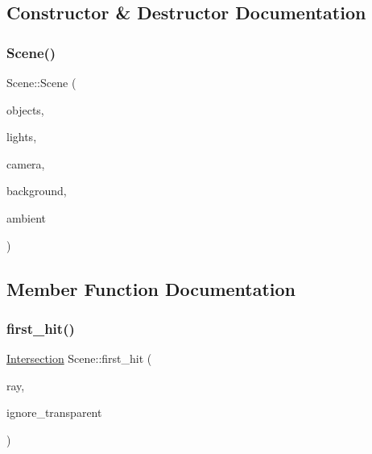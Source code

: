 \subsection{Constructor \& Destructor Documentation}
\mbox{\label{classScene_aa05f285f7a7df49c03ce32fb1c43c9ae}} 
\subsubsection{\texorpdfstring{Scene()}{Scene()}}
{\footnotesize\ttfamily Scene\+::\+Scene (\begin{DoxyParamCaption}\item[{const std\+::vector$<$ \mbox{\hyperlink{classRenderObject}{Render\+Object}} $\ast$ $>$ \&}]{objects,  }\item[{const std\+::vector$<$ \mbox{\hyperlink{classLight}{Light}} $\ast$ $>$ \&}]{lights,  }\item[{\mbox{\hyperlink{classcamera_1_1Camera}{camera\+::\+Camera}} $\ast$}]{camera,  }\item[{\mbox{\hyperlink{classVector3D}{Vector3D}}}]{background,  }\item[{\mbox{\hyperlink{classVector3D}{Vector3D}}}]{ambient }\end{DoxyParamCaption})}



\subsection{Member Function Documentation}
\mbox{\label{classScene_a671595e773bd4336c0fa67186aff609d}} 
\subsubsection{\texorpdfstring{first\_hit()}{first\_hit()}\hspace{0.1cm}{\footnotesize\ttfamily [1/2]}}
{\footnotesize\ttfamily \mbox{\hyperlink{classIntersection}{Intersection}} Scene\+::first\+\_\+hit (\begin{DoxyParamCaption}\item[{const \mbox{\hyperlink{classRay}{Ray}} \&}]{ray,  }\item[{bool}]{ignore\+\_\+transparent }\end{DoxyParamCaption})\hspace{0.3cm}{\ttfamily [private]}}

